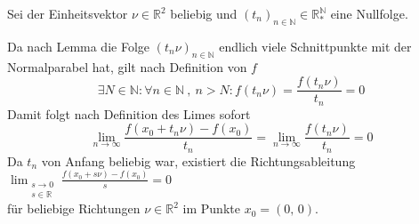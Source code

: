 \documentclass[a4paper, 12pt]{scrartcl}
\begin{document}
Sei der Einheitsvektor $\nu \in \mathbb{R}^2$ beliebig und $(t_n)_{n \in \mathbb{N}} \in \mathbb{R}_*^{\mathbb{N}}$ eine Nullfolge.

Da nach Lemma die Folge $(t_n\nu)_{n \in \mathbb{N}}$ endlich viele Schnittpunkte mit der Normalparabel hat, gilt nach Definition von $f$
\[ \exists N \in \mathbb{N}: \forall n \in \mathbb{N}~,~n>N: f(t_n\nu) = \frac{f(t_n\nu)}{t_n} = 0 \]
Damit folgt nach Definition des Limes sofort
\[ \lim_{n \rightarrow \infty} \frac{f(x_0 + t_n\nu) - f(x_0)}{t_n} = \lim_{n \rightarrow \infty} \frac{f(t_n\nu)}{t_n} = 0 \]
Da $t_n$ von Anfang beliebig war, existiert die Richtungsableitung $\displaystyle\lim_{\substack{s \rightarrow 0\\s \in \mathbb{R}}}\frac{f(x_0 + s\nu) - f(x_0)}{s} = 0$ \\
für beliebige Richtungen $\nu \in \mathbb{R}^2$ im Punkte $x_0 = (0,\,0)$.
\end{document}
